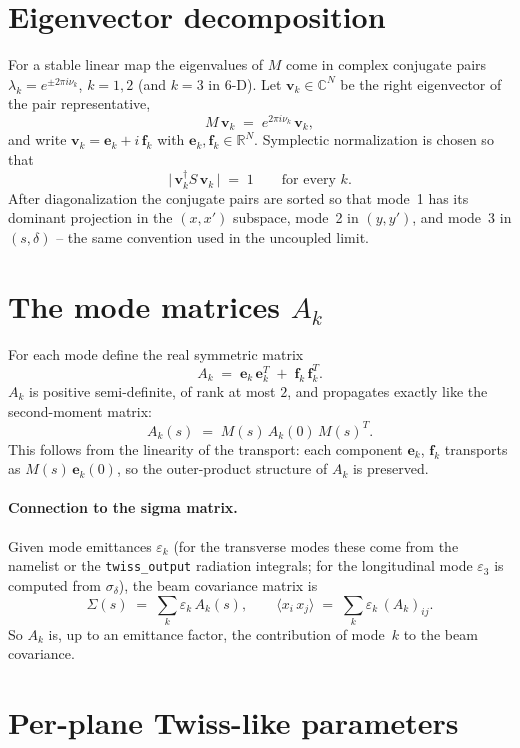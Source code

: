 \documentclass[11pt]{article}
\begin{document}
\section{Eigenvector decomposition}

For a stable linear map the eigenvalues of $M$ come in complex conjugate
pairs $\lambda_k = e^{\pm 2\pi i\nu_k}$, $k = 1,2$ (and $k=3$ in 6-D). Let
$\mathbf{v}_k \in \mathbb{C}^N$ be the right eigenvector of the pair
representative,
\[
   M\,\mathbf{v}_k \;=\; e^{2\pi i \nu_k}\,\mathbf{v}_k ,
\]
and write $\mathbf{v}_k = \mathbf{e}_k + i\,\mathbf{f}_k$ with
$\mathbf{e}_k,\mathbf{f}_k \in \mathbb{R}^N$. Symplectic normalization is
chosen so that
\[
   \bigl|\,\mathbf{v}_k^\dagger S\,\mathbf{v}_k\,\bigr| \;=\; 1
   \qquad \text{for every $k$.}
\]
After diagonalization the conjugate pairs are sorted so that mode~1 has its
dominant projection in the $(x,x')$ subspace, mode~2 in $(y,y')$, and
mode~3 in $(s,\delta)$ -- the same convention used in the uncoupled limit.

\section{The mode matrices $A_k$}

For each mode define the real symmetric matrix
\[
   \boxed{\;
   A_k \;=\; \mathbf{e}_k\,\mathbf{e}_k^T \;+\; \mathbf{f}_k\,\mathbf{f}_k^T .
   \;}
\]
$A_k$ is positive semi-definite, of rank at most $2$, and propagates exactly
like the second-moment matrix:
\[
   \boxed{\; A_k(s) \;=\; M(s)\, A_k(0)\, M(s)^T . \;}
\]
This follows from the linearity of the transport: each component
$\mathbf{e}_k$, $\mathbf{f}_k$ transports as $M(s)\,\mathbf{e}_k(0)$, so the
outer-product structure of $A_k$ is preserved.

\paragraph{Connection to the sigma matrix.}
Given mode emittances $\varepsilon_k$ (for the transverse modes these come
from the namelist or the \verb|twiss_output| radiation integrals; for the
longitudinal mode $\varepsilon_3$ is computed from $\sigma_\delta$), the
beam covariance matrix is
\[
   \Sigma(s) \;=\; \sum_k \varepsilon_k\, A_k(s) ,
   \qquad
   \langle x_i\,x_j\rangle \;=\; \sum_k \varepsilon_k\, (A_k)_{ij} .
\]
So $A_k$ is, up to an emittance factor, the contribution of mode~$k$ to the
beam covariance.

\section{Per-plane Twiss-like parameters}
\end{document}
